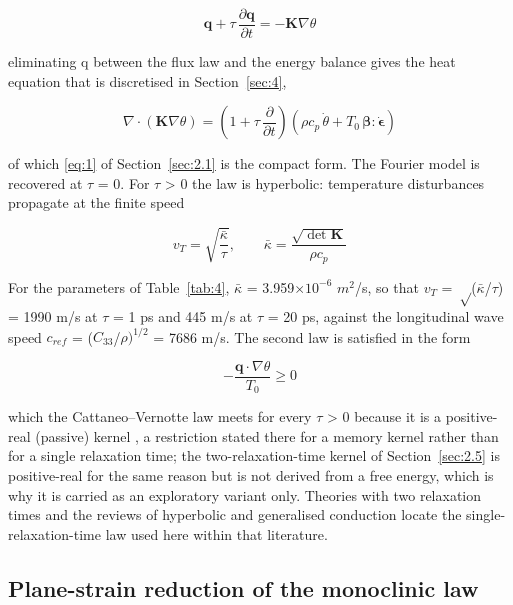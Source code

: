 \documentclass[preprint,12pt]{elsarticle}
\begin{document}
\begin{equation}
\mathbf{q}+\tau\,\frac{\partial\mathbf{q}}{\partial t}=-\mathbf{K}\nabla\theta 
\label{eq:6}
\end{equation}

eliminating q between the flux law and the energy balance gives the heat equation that is discretised in Section~\ref{sec:4},

\begin{equation}
\nabla\cdot\left(\mathbf{K}\nabla\theta\right)=\left(1+\tau\,\frac{\partial}{\partial t}\right)\left(\rho c_p\,\dot\theta+T_0\,\boldsymbol{\beta}:\dot{\boldsymbol{\epsilon}}\right) 
\label{eq:7}
\end{equation}

of which \eqref{eq:1} of Section~\ref{sec:2.1} is the compact form. The Fourier model is recovered at $\tau$ = 0. For $\tau$ > 0 the law is hyperbolic: temperature disturbances propagate at the finite speed

\begin{equation}
v_T=\sqrt{\frac{\bar\kappa}{\tau}},\qquad \bar\kappa=\frac{\sqrt{\det\mathbf{K}}}{\rho c_p} 
\label{eq:8}
\end{equation}

For the parameters of Table~\ref{tab:4}, $\bar{\kappa}$ = 3.959$\times 10^{-6}$ $m^{2}$/s, so that $v_{T}$ = $\sqrt$($\bar{\kappa}$/$\tau$) = 1990 m/s at $\tau$ = 1 ps and 445 m/s at $\tau$ = 20 ps, against the longitudinal wave speed $c_{ref}$ = ($C_{33}$/$\rho)^{1/2}$ = 7686 m/s. The second law is satisfied in the form

\begin{equation}
-\frac{\mathbf{q}\cdot\nabla\theta}{T_0}\geq 0 
\label{eq:9}
\end{equation}

which the Cattaneo--Vernotte law meets for every $\tau$ > 0 because it is a positive-real (passive) kernel \cite{gurtin1968}, a restriction stated there for a memory kernel rather than for a single relaxation time; the two-relaxation-time kernel of Section~\ref{sec:2.5} is positive-real for the same reason but is not derived from a free energy, which is why it is carried as an exploratory variant only. Theories with two relaxation times \cite{greenlindsay1972,greennaghdi1993,hetnarski1993} and the reviews of hyperbolic and generalised conduction \cite{chandra1998,huang2025,ignaczak2010,straughan2011,chandra1986,josephpreziosi1989} locate the single-relaxation-time law used here within that literature.

\subsection{Plane-strain reduction of the monoclinic law}
\label{sec:2.3}
\end{document}
